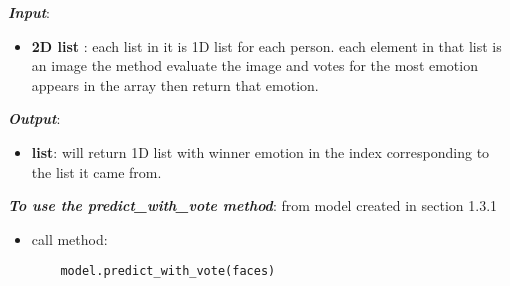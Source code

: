 \noindent\textbf{\textit{Input}}:
\begin{itemize}
	\item \textbf{2D list }:\newline
	each list in it is 1D list for each person. each element in that list is an image the method evaluate the image and votes for the most emotion appears in the array then return that emotion.
\end{itemize}
\noindent\textbf{\textit{Output}}:
\begin{itemize}
	\item \textbf{list}:\newline
	will return 1D list with winner emotion in the index corresponding to the list it came from.
\end{itemize}

\textbf{\textit{To use the predict\_with\_vote method}}:
\bigbreak
from model created in section 1.3.1

\begin{itemize}
	\item call method:
	\begin{verbatim}
	model.predict_with_vote(faces)
	\end{verbatim}
\end{itemize}